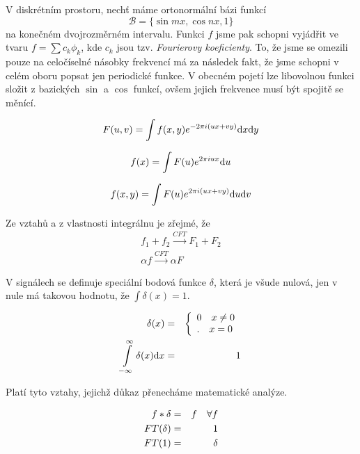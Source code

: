 V diskrétním prostoru, nechť máme ortonormální bázi funkcí 
\begin{equation}
\mathcal{B}=\{\sin mx,\cos nx,1\}
\end{equation}
na konečném
dvojrozměrném intervalu. Funkci $f$ jsme pak schopni
vyjádřit ve tvaru $f=\sum c_k \phi_k$, kde $c_k$ jsou tzv. {\em Fourierovy koeficienty}. To, že jsme se omezili pouze na
celočíselné násobky frekvencí má za následek fakt, že jsme schopni v celém oboru popsat jen periodické funkce. V obecném
 pojetí lze libovolnou funkci složit z bazických $\sin$ a $\cos$ funkcí, ovšem jejich frekvence musí být spojitě se měnící.
 
\begin{equation}
F(u,v)=\int f(x,y)e^{-2\pi i (ux+vy)}{\rm d} x{\rm d} y
\end{equation}

\begin{equation}
f(x)=\int F(u)e^{2\pi i u x}{\rm d} u
\end{equation}

\begin{equation}
f(x,y)=\int F(u)e^{2\pi i (u x+vy)}{\rm d} u{\rm d} v
\end{equation}
 
Ze vztahů a z vlastnosti integrálnu je zřejmé, že 
\begin{eqnarray}
f_1+f_2\stackrel{CFT}{\rightarrow} F_1+F_2\\
\alpha f \stackrel{CFT}{\rightarrow} \alpha F
\end{eqnarray}


V signálech se definuje speciální bodová funkce $\delta$, která je všude nulová, jen v nule má takovou hodnotu, že
$\int \delta(x)=1$.

\begin{eqnarray}
\delta(x)&=&\left\{\begin{array}{ll}0\quad x\neq0\\.\quad x=0\end{array}\right.\\
\int\limits_{-\infty}^\infty\delta(x){\rm d} x&=&1
\end{eqnarray}

Platí tyto vztahy, jejichž důkaz přenecháme matematické analýze.

\begin{eqnarray}
f\ast\delta&=&f\quad\forall f\\
FT(\delta)&=&1\\
FT(1)&=&\delta
\end{eqnarray}

